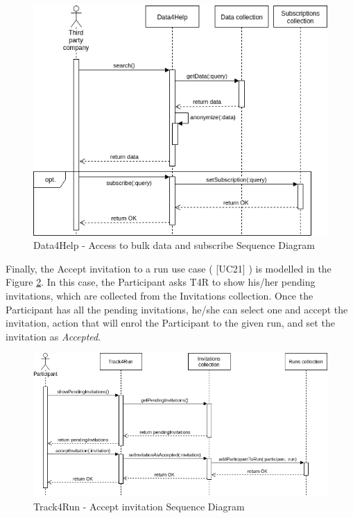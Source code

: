 \documentclass[hidelinks, 12pt]{report}
\newcommand\usecase[1]{ [UC#1] }
\begin{document}
\begin{figure}[H]
\centering
	\includegraphics[scale=0.6]{Diagrams/d4h_seq_subscribe_to_bulk_query.png}
\caption[Data4Help - Access to bulk data and subscribe Sequence Diagram]{Data4Help - Access to bulk data and subscribe Sequence Diagram}
\label{fig:d4h_seq_bulk_data}
\end{figure}

Finally, the Accept invitation to a run use case (\usecase{21}) is modelled in the Figure \ref{fig:t4r_accept_invitation}. In this case, the Participant asks T4R to show his/her pending invitations, which are collected from the Invitations collection. Once the Participant has all the pending invitations, he/she can select one and accept the invitation, action that will enrol the Participant to the given run, and set the invitation as \textit{Accepted}.

\begin{figure}[H]
\centering
	\includegraphics[scale=0.6]{Diagrams/t4r_seq_accept_invitation.png}
\caption[Track4Run - Accept invitation Sequence Diagram]{Track4Run - Accept invitation Sequence Diagram}
\label{fig:t4r_accept_invitation}
\end{figure}
\end{document}
